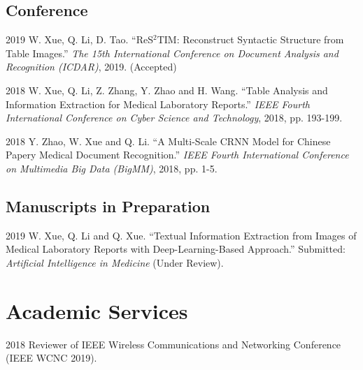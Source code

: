\documentclass[12pt,letterpaper]{report}
\begin{document}
  \subsection*{Conference}

	\begin{tablist}

		\item[2019] \tab W. Xue, Q. Li, D. Tao. \enquote{ReS$^2$TIM: Reconstruct Syntactic Structure from Table Images.} \textit{The 15th International Conference on Document Analysis and Recognition (ICDAR)}, 2019. (Accepted)

		\item[2018] \tab W. Xue, Q. Li, Z. Zhang, Y. Zhao and H. Wang. \enquote{Table Analysis and Information Extraction for Medical Laboratory Reports.} \textit{IEEE Fourth International Conference on Cyber Science and Technology}, 2018, pp. 193-199.

		\item[2018] \tab Y. Zhao, W. Xue and Q. Li. \enquote{A Multi-Scale CRNN Model for Chinese Papery Medical Document Recognition.} \textit{IEEE Fourth International Conference on Multimedia Big Data (BigMM)}, 2018, pp. 1-5.

  \end{tablist}



	\subsection*{Manuscripts in Preparation}

	\begin{tablist}

		\item[2019] \tab W. Xue, Q. Li and Q. Xue. \enquote{Textual Information Extraction from Images of Medical Laboratory Reports with Deep-Learning-Based Approach.} Submitted: \textit{Artificial Intelligence in Medicine} (Under Review).

	\end{tablist}


  \section*{Academic Services}

	\begin{tablist}
		\item[2018] \tab Reviewer of IEEE Wireless Communications and Networking Conference (IEEE WCNC 2019).
	\end{tablist}
\end{document}
